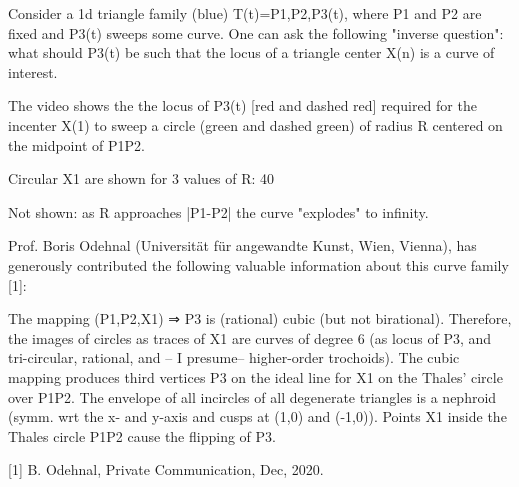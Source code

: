 Consider a 1d triangle family (blue) T(t)={P1,P2,P3(t)}, where P1 and P2 are fixed and P3(t) sweeps some curve. One can ask the following "inverse question": what should P3(t) be such that the locus of a triangle center X(n) is a curve of interest.

The video shows the the locus of P3(t) [red and dashed red] required for the incenter X(1) to sweep a circle (green and dashed green) of radius R centered on the midpoint of P1P2.

Circular X1 are shown for 3 values of R: 40%

Not shown: as R approaches |P1-P2| the curve "explodes" to infinity.

Prof. Boris Odehnal (Universität für angewandte Kunst, Wien, Vienna), has generously contributed the following valuable information about this curve family [1]:

The mapping (P1,P2,X1) ⇒ P3 is (rational) cubic (but not birational). Therefore, the images of circles as traces of X1 are curves of degree 6 (as locus of P3, and tri-circular, rational, and -- I presume-- higher-order trochoids). The cubic mapping produces third vertices P3 on the ideal line for X1 on the Thales' circle over P1P2. The envelope of all incircles of all degenerate triangles is a nephroid (symm. wrt the x- and y-axis and cusps at (1,0) and (-1,0)). Points X1 inside the Thales circle P1P2 cause the flipping of P3.

[1] B. Odehnal, Private Communication, Dec, 2020.